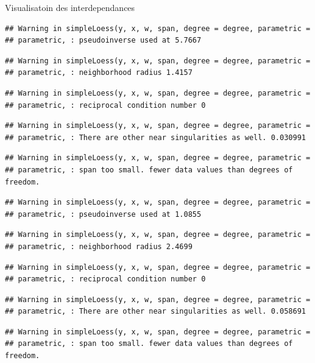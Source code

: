 \documentclass[11pt,ignorenonframetext,]{beamer}
\begin{document}
\begin{frame}[fragile]{Visualisatoin des interdependances}
\begin{verbatim}
## Warning in simpleLoess(y, x, w, span, degree = degree, parametric =
## parametric, : pseudoinverse used at 5.7667
\end{verbatim}

\begin{verbatim}
## Warning in simpleLoess(y, x, w, span, degree = degree, parametric =
## parametric, : neighborhood radius 1.4157
\end{verbatim}

\begin{verbatim}
## Warning in simpleLoess(y, x, w, span, degree = degree, parametric =
## parametric, : reciprocal condition number 0
\end{verbatim}

\begin{verbatim}
## Warning in simpleLoess(y, x, w, span, degree = degree, parametric =
## parametric, : There are other near singularities as well. 0.030991
\end{verbatim}

\begin{verbatim}
## Warning in simpleLoess(y, x, w, span, degree = degree, parametric =
## parametric, : span too small. fewer data values than degrees of freedom.
\end{verbatim}

\begin{verbatim}
## Warning in simpleLoess(y, x, w, span, degree = degree, parametric =
## parametric, : pseudoinverse used at 1.0855
\end{verbatim}

\begin{verbatim}
## Warning in simpleLoess(y, x, w, span, degree = degree, parametric =
## parametric, : neighborhood radius 2.4699
\end{verbatim}

\begin{verbatim}
## Warning in simpleLoess(y, x, w, span, degree = degree, parametric =
## parametric, : reciprocal condition number 0
\end{verbatim}

\begin{verbatim}
## Warning in simpleLoess(y, x, w, span, degree = degree, parametric =
## parametric, : There are other near singularities as well. 0.058691
\end{verbatim}

\begin{verbatim}
## Warning in simpleLoess(y, x, w, span, degree = degree, parametric =
## parametric, : span too small. fewer data values than degrees of freedom.
\end{verbatim}


\end{frame}
\end{document}
